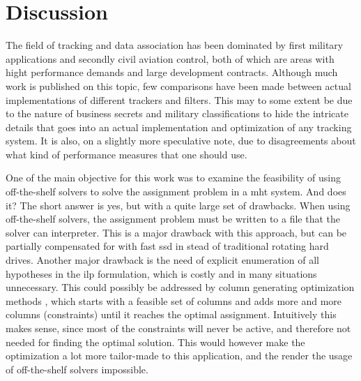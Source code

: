\section{Discussion}
\label{sec:discussion}
The field of tracking and data association has been dominated by first military applications and secondly civil aviation control, both of which are areas with hight performance demands and large development contracts. Although much work is published on this topic, few comparisons have been made between actual implementations of different trackers and filters. This may to some extent be due to the nature of business secrets and military classifications to hide the intricate details that goes into an actual implementation and optimization of any tracking system. It is also, on a slightly more speculative note, due to disagreements about what kind of performance measures that one should use. 

One of the main objective for this work was to examine the feasibility of using off-the-shelf solvers to solve the assignment problem in a \gls{mht} system. And does it? The short answer is yes, but with a quite large set of drawbacks. When using off-the-shelf solvers, the assignment problem must be written to a file that the solver can interpreter. This is a major drawback with this approach, but can be partially compensated for with fast \gls{ssd} in stead of traditional rotating hard drives. Another major drawback is the need of explicit enumeration of all hypotheses in the \gls{ilp} formulation, which is costly and in many situations unnecessary. This could possibly be addressed by column generating optimization methods \cite{Barnhart1998}, which starts with a feasible set of columns and adds more and more columns (constraints) until it reaches the optimal assignment. Intuitively this makes sense, since most of the constraints will never be active, and therefore not needed for finding the optimal solution. This would however make the optimization a lot more tailor-made to this application, and the render the usage of off-the-shelf solvers impossible.

